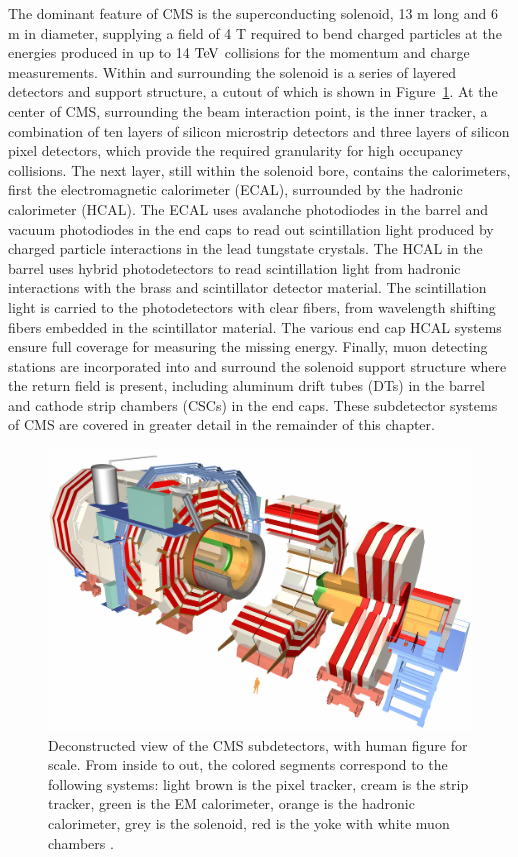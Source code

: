 \indent The dominant feature of CMS is the superconducting solenoid, 13 m long and 6 m in diameter, supplying a field of 4 T required to bend charged particles at the energies produced in up to 14 $\mathrm{Te\kern -0.1em V}$ collisions for the momentum and charge measurements. Within and surrounding the solenoid is a series of layered detectors and support structure, a cutout of which is shown in Figure~\ref{fig:cms}. At the center of CMS, surrounding the beam interaction point, is the inner tracker, a combination of ten layers of silicon microstrip detectors and three layers of silicon pixel detectors, which provide the required granularity for high occupancy collisions. The next layer, still within the solenoid bore, contains the calorimeters, first the electromagnetic calorimeter (ECAL), surrounded by the hadronic calorimeter (HCAL). The ECAL uses avalanche photodiodes in the barrel and vacuum photodiodes in the end caps to read out scintillation light produced by charged particle interactions in the lead tungstate crystals. The HCAL in the barrel uses hybrid photodetectors to read scintillation light from hadronic interactions with the brass and scintillator detector material. The scintillation light is carried to the photodetectors with clear fibers, from wavelength shifting fibers embedded in the scintillator material. The various end cap HCAL systems ensure full coverage for measuring the missing energy. Finally, muon detecting stations are incorporated into and surround the solenoid support structure where the return field is present, including aluminum drift tubes (DTs) in the barrel and cathode strip chambers (CSCs) in the end caps. These subdetector systems of CMS are covered in greater detail in the remainder of this chapter. 

\begin{figure}[tbh]
\centering
\includegraphics[width=6in]{figures/cms.jpg}
\caption{Deconstructed view of the CMS subdetectors, with human figure for scale. From inside to out, the colored segments correspond to the following systems: light brown is the pixel tracker, cream is the strip tracker, green is the EM calorimeter, orange is the hadronic calorimeter, grey is the solenoid, red is the yoke with white muon chambers \cite{1748-0221-3-08-S08004}. }
\label{fig:cms}
\end{figure}

